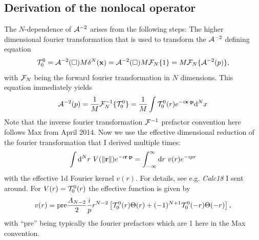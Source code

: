 \documentclass[10pt,a4paper]{article}
\begin{document}
\subsection{Derivation of the nonlocal operator}\label{sec:nonlocal-backward}
The $N$-dependence of ${\cal A}^{-2}$ arises from the following steps: The higher dimensional fourier transformation that is used to transform the ${\cal A}^{-2}$ defining equation
\begin{equation}
{\cal T}^0_0 = {\cal A}^{-2}(\square) M \delta^N(\mathbf{ x })
= {\cal A}^{-2}(\square) M {\cal F}_N\{1\} = M {\cal F}_N\{ {\cal A}^{-2}(p) \},
\end{equation}
with ${\cal F}_N$ being the forward fourier transformation in $N$ dimensions. This equation immediately yields
\begin{equation}\label{eq:defA2}
{\cal A}^{-2}(p) = \frac{1}{M} {\cal F}^{-1}_N \{ {\cal T}^0_0 \}
= \frac{1}{M} \int {\cal T}^0_0(r) e^{-i \mathbf{ x } \cdot \mathbf{ p }} \mathrm{d}^N x
\end{equation}
Note that the inverse fourier transformation ${\cal F}^{-1}$ prefactor convention here follows Max \cite{work} from April 2014. Now we use the effective dimensional reduction of the fourier transformation that I derived multiple times:
\begin{equation}
\int \mathrm{d}^N r ~ V(\| \mathbf{ r }\|) e^{-i \mathbf{ r } \cdot \mathbf{ p }}
= \int_{-\infty}^\infty \mathrm{d} r~v(r) e^{-ipr}
\end{equation}
with the effective 1d Fourier kernel $v(r)$. For details, see e.g. \emph{Calc18} I sent around. For $V(r) = {\cal T}^0_0(r)$ the effective function is given by
\begin{equation}\label{eq:veff1}
v(r) = \text{pre} \frac{A_{N-2}}{2} \frac{i}{p}
r^{N-2} \left[ {\cal T}^0_0(r) \Theta(r) + 
(-1)^{N+1} {\cal T}^0_0(-r) \Theta(-r) \right],
\end{equation}
with ``pre'' being typically the fourier prefactors which are 1 here in the Max convention.
\end{document}

